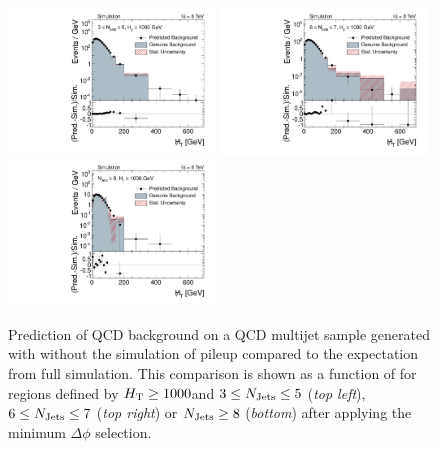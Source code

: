  \begin{figure}[!t]
  \centering

  \begin{minipage}[c]{1.\textwidth}
    \begin{center}
      \includegraphics[width=0.49\textwidth]{figures/MHT_JetBin2_HThigh_pythia_chsJets_pt0_NoPU_v1.pdf}%
      \includegraphics[width=0.49\textwidth]{figures/MHT_JetBin3_HThigh_pythia_chsJets_pt0_NoPU_v1.pdf}\\ 
      \includegraphics[width=0.49\textwidth]{figures/MHT_JetBin4_HThigh_pythia_chsJets_pt0_NoPU_v1.pdf}
    \end{center}
  \end{minipage}
  \caption{Prediction of QCD background on a QCD multijet sample generated with \pythia without the simulation of pileup compared to the expectation from full simulation. This comparison is shown as a function of \MHT for regions defined by $H_{\text{T}} \ge 1000$\gev and $3 \le N_{\text{Jets}} \le 5$ (\textit{top left}), $6 \le N_{\text{Jets}} \le 7$ (\textit{top right}) or $N_{\text{Jets}} \ge 8$ (\textit{bottom}) after applying the minimum $\Delta \phi$ selection.}
  \label{fig:qcd_rs_closure_nopu}
\end{figure}

